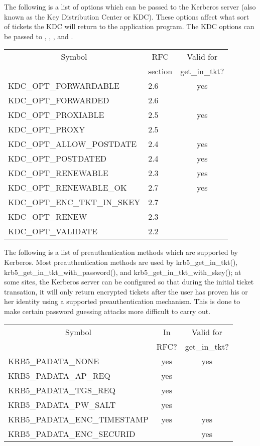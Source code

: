 The following is a list of options which can be passed to the Kerberos
server (also known as the Key Distribution Center or KDC).  These
options affect what sort of tickets the KDC will return to the
application program.  The KDC options can be passed to
, ,
, and . 


\begin{center}
\begin{tabular}{llc}
\multicolumn{1}{c}{Symbol}&\multicolumn{1}{c}{RFC}& Valid for \\
&\multicolumn{1}{c}{section}&get_in_tkt? \\ \hline
KDC_OPT_FORWARDABLE	& 2.6	& yes		\\
KDC_OPT_FORWARDED	& 2.6	&		\\
KDC_OPT_PROXIABLE	& 2.5	& yes		\\
KDC_OPT_PROXY		& 2.5	&		\\
KDC_OPT_ALLOW_POSTDATE	& 2.4	& yes		\\
KDC_OPT_POSTDATED	& 2.4	& yes		\\
KDC_OPT_RENEWABLE	& 2.3	& yes		\\
KDC_OPT_RENEWABLE_OK	& 2.7	& yes		\\
KDC_OPT_ENC_TKT_IN_SKEY	& 2.7	&		\\
KDC_OPT_RENEW		& 2.3	&		\\
KDC_OPT_VALIDATE	& 2.2	&		\\
\end{tabular}
\end{center}
\label{KDCOptions}

The following is a list of preauthentication methods which are supported
by Kerberos.  Most preauthentication methods are used by
krb5_get_in_tkt(), krb5_get_in_tkt_with_password(), and
krb5_get_in_tkt_with_skey(); at some sites, the Kerberos server can be
configured so that during the initial ticket transation, it will only
return encrypted tickets after the user has proven his or her identity
using a supported preauthentication mechanism.  This is done to make
certain password guessing attacks more difficult to carry out.



\begin{center}
\begin{tabular}{lcc}
\multicolumn{1}{c}{Symbol}&In & Valid for \\
&RFC?&get_in_tkt? \\ \hline
KRB5_PADATA_NONE		& yes	& yes	\\
KRB5_PADATA_AP_REQ		& yes	&	\\
KRB5_PADATA_TGS_REQ		& yes	&	\\
KRB5_PADATA_PW_SALT		& yes	&	\\
KRB5_PADATA_ENC_TIMESTAMP	& yes	& yes	\\
KRB5_PADATA_ENC_SECURID		&	& yes	\\
\end{tabular}
\end{center}
\label{padata-types}

